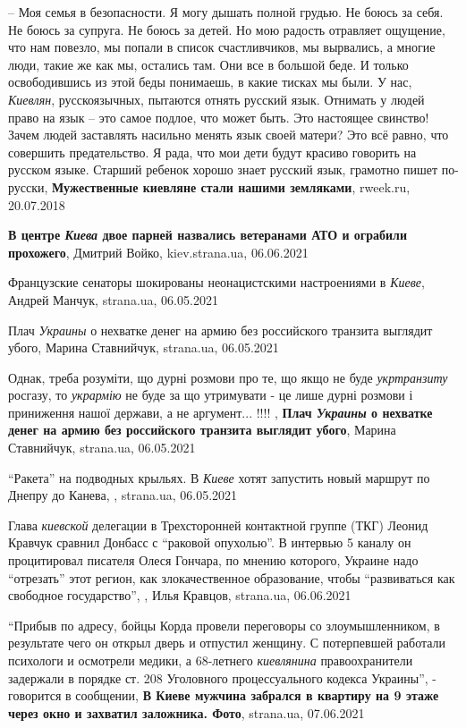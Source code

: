 – Моя семья в безопасности. Я могу дышать полной грудью. Не боюсь за себя. Не
боюсь за супруга. Не боюсь за детей. Но мою радость отравляет ощущение, что нам
повезло, мы попали в список счастливчиков, мы вырвались, а многие люди, такие
же как мы, остались там. Они все в большой беде. И только освободившись из этой
беды понимаешь, в какие тисках мы были.  У нас, \emph{Киевлян}, русскоязычных,
пытаются отнять русский язык. Отнимать у людей право на язык – это самое
подлое, что может быть. Это настоящее свинство! Зачем людей заставлять насильно
менять язык своей матери? Это всё равно, что совершить предательство. Я рада,
что мои дети будут красиво говорить на русском языке. Старший ребенок хорошо
знает русский язык, грамотно пишет по-русски,
\textbf{Мужественные киевляне стали нашими земляками}, rweek.ru, 20.07.2018

\textbf{В центре \emph{Киева} двое парней назвались ветеранами АТО и ограбили прохожего},
Дмитрий Войко, kiev.strana.ua, 06.06.2021

Французские сенаторы шокированы неонацистскими настроениями в \emph{Киеве},
Андрей Манчук, strana.ua, 06.05.2021

Плач \emph{Украины} о нехватке денег на армию без российского транзита выглядит
убого, Марина Ставнийчук, strana.ua, 06.05.2021

Однак, треба розуміти, що дурні розмови про те, що якщо не буде \emph{укртранзиту}
росгазу, то \emph{укрармію} не буде за що утримувати - це лише дурні розмови і
приниження нашої держави, а не аргумент... !!!! ,
\textbf{Плач \emph{Украины} о нехватке денег на армию без российского транзита выглядит убого},
Марина Ставнийчук, strana.ua, 06.05.2021

\enquote{Ракета} на подводных крыльях. В \emph{Киеве} хотят запустить новый
маршрут по Днепру до Канева, , strana.ua, 06.05.2021

Глава \emph{киевской} делегации в Трехсторонней контактной группе (ТКГ) Леонид
Кравчук сравнил Донбасс с \enquote{раковой опухолью}.  В интервью 5 каналу он
процитировал писателя Олеся Гончара, по мнению которого, Украине надо
\enquote{отрезать} этот регион, как злокачественное образование, чтобы
\enquote{развиваться как свободное государство},
, Илья Кравцов, strana.ua, 06.06.2021

\enquote{Прибыв по адресу, бойцы Корда провели переговоры со злоумышленником, в
результате чего он открыл дверь и отпустил женщину. С потерпевшей работали
психологи и осмотрели медики, а 68-летнего \emph{киевлянина} правоохранители задержали
в порядке ст. 208 Уголовного процессуального кодекса Украины}, - говорится в
сообщении, 
\textbf{В Киеве мужчина забрался в квартиру на 9 этаже через окно и захватил заложника. Фото},
strana.ua, 07.06.2021

